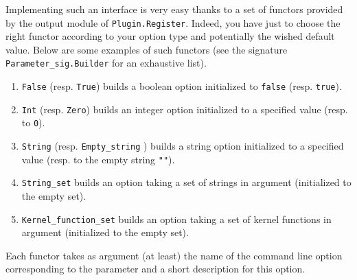 Implementing such an interface is very easy thanks to a set of functors provided
by the output module of
\texttt{Plugin.Register}. Indeed, you have just to
choose the right functor according to your option type and potentially
the wished default value. Below are some examples of such functors
(see the signature
\texttt{Parameter\_sig.Builder} for an
exhaustive list).
\begin{enumerate}
\item \texttt{False}
  (resp. \texttt{True}) builds a
  boolean option initialized to \texttt{false} (resp. \texttt{true}).
\item \texttt{Int}
  (resp. \texttt{Zero}) builds an
  integer option initialized to a specified value (resp. to \texttt{0}).
\item \texttt{String}
  (resp. \texttt{Empty\_string}
  ) builds a string option
  initialized to a specified value (resp. to the empty string \texttt{""}).
\item \texttt{String\_set}
  builds an option taking a set of strings in argument (initialized to the empty
  set).
\item
  \texttt{Kernel\_function\_set}%
 builds an option
taking a set of kernel functions in argument (initialized to the empty set).
\end{enumerate}
Each functor takes as argument (at least) the name of the command line option
corresponding to the parameter and a short description for this option.


